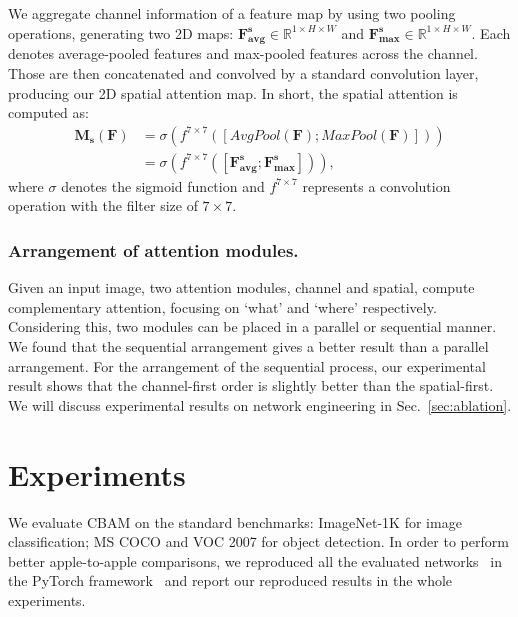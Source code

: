 \documentclass[runningheads]{llncs}
\newcommand{\sref}[1]{Sec.~\ref{#1}}
\begin{document}
We aggregate channel information of a feature map by using two pooling operations, generating two 2D maps: \(\mathbf{F^{s}_{avg}}\in \mathbb{R}^{1\times H\times W}\) and \(\mathbf{F^{s}_{max}}\in \mathbb{R}^{1\times H\times W}\). Each denotes average-pooled features and max-pooled features across the channel. Those are then concatenated and convolved by a standard convolution layer, producing our 2D spatial attention map. In short, the spatial attention is computed as:
\begin{equation}\label{eq:forth}
\begin{split}
    \mathbf{M_s}(\mathbf{F})&=\sigma(f^{7\times 7}([AvgPool(\mathbf{F}); MaxPool(\mathbf{F})]))\\
    &=\sigma(f^{7\times 7}([\mathbf{F^{s}_{avg}}; \mathbf{F^{s}_{max}}])),
\end{split}
\end{equation}
where \(\sigma\) denotes the sigmoid function and \(f^{7\times 7}\) represents a convolution operation with the filter size of $7\times 7$.

\subsubsection{Arrangement of attention modules.}
Given an input image, two attention modules, channel and spatial, compute complementary attention, focusing on `what' and `where' respectively. Considering this, two modules can be placed in a parallel or sequential manner. We found that the sequential arrangement gives a better result than a parallel arrangement. For the arrangement of the sequential process, our experimental result shows that the channel-first order is slightly better than the spatial-first. We will discuss experimental results on network engineering in \sref{sec:ablation}. %

\section {Experiments}\label{sec:experiments}
We evaluate CBAM on the standard benchmarks: ImageNet-1K for image classification; MS COCO and VOC 2007 for object detection. In order to perform better apple-to-apple comparisons, we reproduced all the evaluated networks~\cite{he2016deep,zagoruyko2016wide,xie2016aggregated,howard2017mobilenets,hu2017squeeze} in the PyTorch framework~\cite{pytorch} and report our reproduced results in the whole experiments.
\end{document}
